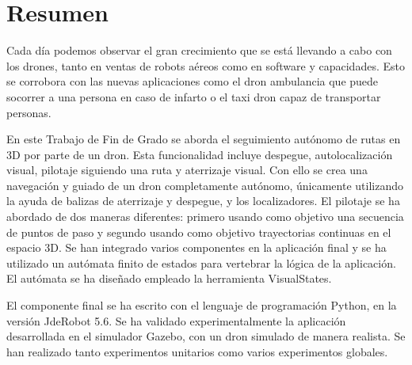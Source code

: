 \documentclass[a4paper, 12pt, oneside]{book}
\begin{document}
\chapter*{Resumen}
\hspace{1cm} Cada día podemos observar el gran crecimiento que se está llevando a cabo con los drones, tanto en ventas de robots aéreos como en software y capacidades. Esto se corrobora con las nuevas aplicaciones como el dron ambulancia que puede socorrer a una persona en caso de infarto o el taxi dron capaz de transportar personas.

\hspace{1cm} En este Trabajo de Fin de Grado se aborda el seguimiento autónomo de rutas en 3D por parte de un dron. Esta funcionalidad incluye despegue, autolocalización visual, pilotaje siguiendo una ruta y aterrizaje visual. Con ello se crea una navegación y guiado de un dron completamente autónomo, únicamente utilizando la ayuda de balizas de aterrizaje y despegue, y los localizadores. El pilotaje se ha abordado de dos maneras diferentes: primero usando como objetivo una secuencia de puntos de paso y segundo usando como objetivo trayectorias continuas en el espacio 3D. Se han integrado varios componentes en la aplicación final y se ha utilizado un autómata finito de estados para vertebrar la lógica de la aplicación. El autómata se ha diseñado empleado la herramienta VisualStates.

\hspace{1cm} El componente final se ha escrito con el lenguaje de programación Python, en la versión JdeRobot 5.6. Se ha validado experimentalmente la aplicación desarrollada en el simulador Gazebo, con un dron simulado de manera realista. Se han realizado tanto experimentos unitarios como varios experimentos globales.

\renewcommand{\tablename}{Tabla}
\tableofcontents %

\listoffigures %
\cleardoublepage

\pagestyle{fancy}
\setlength{\parindent}{6mm}

\lhead[]{}






\end{document}
